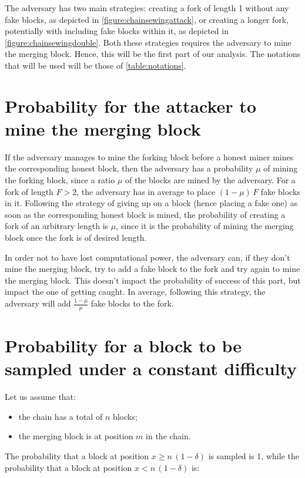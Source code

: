       The adversary has two main strategies: creating a fork of length 1 without any fake blocks, as depicted in \autoref{figure:chainsewingattack}, or creating a longer fork, potentially with including fake blocks within it, as depicted in \autoref{figure:chainsewingdouble}. Both these strategies requires the adversary to mine the merging block. Hence, this will be the first part of our analysis. The notations that will be used will be those of \autoref{table:notations}.
      
      \section{Probability for the attacker to mine the merging block}
        \label{section:miningprob}
        If the adversary manages to mine the forking block before a honest miner mines the corresponding honest block, then the adversary has a probability \(\mu\) of mining the forking block, since a ratio \(\mu\) of the blocks are mined by the adversary. For a fork of length \(F>2\), the adversary has in average to place \((1-\mu)\,F\) fake blocks in it. Following the strategy of giving up on a block (hence placing a fake one) as soon as the corresponding honest block is mined, the probability of creating a fork of an arbitrary length is \(\mu\), since it is the probability of mining the merging block once the fork is of desired length.
        
        In order not to have lost computational power, the adversary can, if they don't mine the merging block, try to add a fake block to the fork and try again to mine the merging block. This doesn't impact the probability of success of this part, but impact the one of getting caught. In average, following this strategy, the adversary will add \(\frac{1-\mu}{\mu}\) fake blocks to the fork.

      \section{Probability for a block to be sampled under a constant difficulty}
        Let us assume that:
        \begin{itemize}
          \item the chain has a total of \(n\) blocks;
          \item the merging block is at position \(m\) in the chain.
        \end{itemize}
        
        The probability that a block at position \(x\geqslant n\,(1-\delta)\) is sampled is 1, while the probability that a block at position \(x< n\,(1-\delta)\) is:
        
